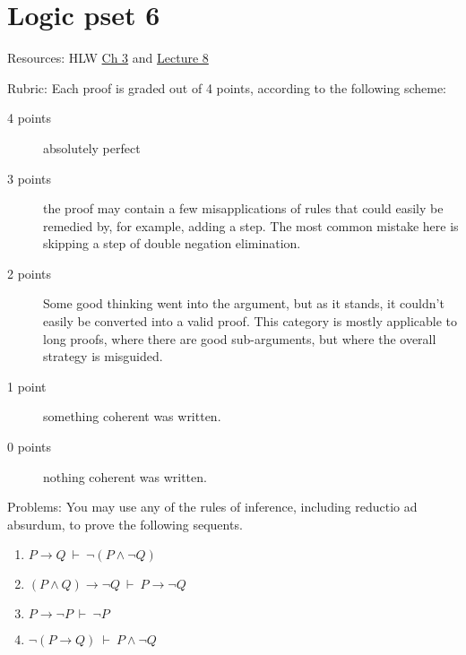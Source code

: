 \documentclass[fleqn,12pt]{article}
\begin{document}
\thispagestyle{empty}

\section*{Logic pset 6}

Resources: HLW \href{https://www.jstor.org/stable/j.ctvxrpz0q.6}{Ch 3}
and
\href{https://princeton.hosted.panopto.com/Panopto/Pages/Viewer.aspx?id=3be71c4d-ebf5-4d02-9101-accf01077417}{Lecture 8}

Rubric: Each proof is graded out of 4 points, according to the following scheme:
\begin{description}
  \item[4 points] absolutely perfect
\item[3 points] the proof may contain a few misapplications of rules that could easily be remedied by, for example, adding a step. The most common mistake here is skipping a step of double negation elimination.
\item[2 points] Some good thinking went into the argument, but as it
  stands, it couldn’t easily be converted into a valid proof. This
  category is mostly applicable to long proofs, where there are good
  sub-arguments, but where the overall strategy is misguided.
\item[1 point] something coherent was written.
\item[0 points] nothing coherent was written. \end{description}

Problems: You may use any of the rules of inference, including reductio ad
absurdum, to prove the following sequents.
\begin{enumerate}
\item $P\to Q\:\vdash\: \neg (P\wedge\neg Q)$
\item $(P\wedge Q)\to \neg Q\:\vdash\: P\to \neg Q$
\item $P\to\neg P\:\vdash\:\neg P$
\item $\neg (P\to Q)\:\vdash\: P\wedge\neg Q$
\end{enumerate}     
\end{document}
